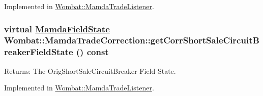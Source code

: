 Implemented in \hyperlink{classWombat_1_1MamdaTradeListener_e7d9e2149cece7e7af95aaf102623d91}{Wombat::Mamda\-Trade\-Listener}.\hypertarget{classWombat_1_1MamdaTradeCorrection_742b32f2bbf95daea48b555fb78f556d}{
\subsubsection[getCorrShortSaleCircuitBreakerFieldState]{\setlength{\rightskip}{0pt plus 5cm}virtual \hyperlink{namespaceWombat_93aac974f2ab713554fd12a1fa3b7d2a}{Mamda\-Field\-State} Wombat::Mamda\-Trade\-Correction::get\-Corr\-Short\-Sale\-Circuit\-Breaker\-Field\-State () const}}
\label{classWombat_1_1MamdaTradeCorrection_742b32f2bbf95daea48b555fb78f556d}


\begin{Desc}
\item[Returns:]The Orig\-Short\-Sale\-Circuit\-Breaker Field State. \end{Desc}


Implemented in \hyperlink{classWombat_1_1MamdaTradeListener_a9ee67b51889ddb8e79a7a8a3d81af5f}{Wombat::Mamda\-Trade\-Listener}.